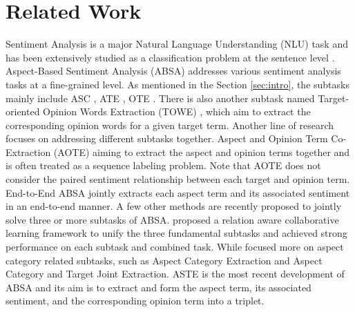 \documentclass[11pt,a4paper]{article}
\begin{document}
\section{Related Work}
\label{relatedwork}
Sentiment Analysis is a major Natural Language Understanding (NLU) task \cite{wang-etal-2018-glue} and has been extensively studied as a classification problem at the sentence level \cite{JMLR:v21:20-074, Lan2020ALBERTAL, yang2020xlnet}.
Aspect-Based Sentiment Analysis (ABSA) \cite{pontiki-EtAl:2014:SemEval} 
addresses various sentiment analysis tasks at a fine-grained level. 
As mentioned in the Section \ref{sec:intro}, the subtasks mainly include ASC \cite{dong2014adaptive, zhang2016gated, chen-etal-2017-recurrent, he-etal-2018-effective, tnet2018, peng2018learning, wang2018learning, he-etal-2019-interactive, li-lu-2019-learning, xu2020}, ATE \cite{qiu-etal-2011-opinion, yin2016unsupervised, li2018aspect, ma-etal-2019-exploring}, OTE \cite{minging2004, yang-cardie-2012-extracting, kinger2013, yang-cardie-2013-joint}. There is also another subtask named Target-oriented Opinion Words Extraction (TOWE) \cite{fan2019target}, which
aim to extract the corresponding opinion words for a given target term.
Another line of research focuses on addressing different subtasks together.
Aspect and Opinion Term Co-Extraction (AOTE) aiming to extract the aspect and opinion terms together  \cite{wang2017coupled, ma-etal-2019-exploring, dai2019neural} and is often treated as a sequence labeling problem.
Note that AOTE does not consider the paired sentiment relationship between 
each target and opinion term.
End-to-End ABSA \cite{li2017sentimentscope, ma2018joint, li2019unified,he-etal-2019-interactive}
jointly extracts each aspect term and its associated sentiment
in an end-to-end manner. 
A few other methods are recently proposed to jointly solve three or more subtasks of ABSA. 
\citet{chen-qian-2020-relation} proposed a relation aware collaborative learning framework to unify the three fundamental subtasks and achieved strong performance on each subtask and combined task.
While \citet{Wan_Yang_Du_Liu_Qi_Pan_2020} focused more on aspect category related subtasks, such as Aspect Category Extraction and Aspect Category and Target Joint Extraction.
ASTE \cite{peng2019knowing,wu-etal-2020-grid,Xu2020PositionAwareTF,zhang-etal-2020-multi-task} is the most recent development of ABSA and its aim is to extract and form the aspect term, its associated sentiment, and the corresponding opinion term into a triplet.
\end{document}
